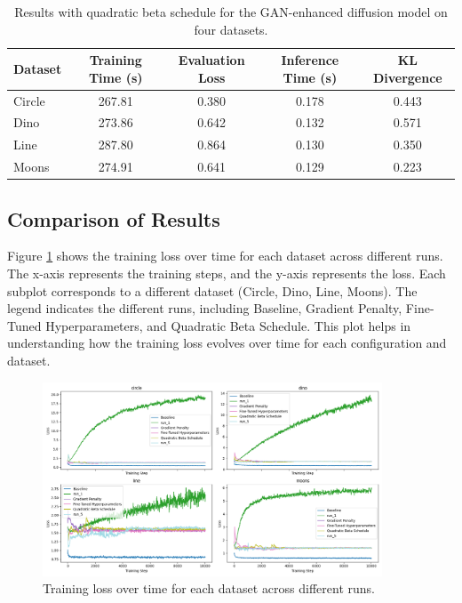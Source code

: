 \documentclass{article} %
\begin{document}
\begin{table}[h]
    \centering
    \begin{tabular}{lcccc}
        \toprule
        Dataset & Training Time (s) & Evaluation Loss & Inference Time (s) & KL Divergence \\
        \midrule
        Circle & 267.81 & 0.380 & 0.178 & 0.443 \\
        Dino & 273.86 & 0.642 & 0.132 & 0.571 \\
        Line & 287.80 & 0.864 & 0.130 & 0.350 \\
        Moons & 274.91 & 0.641 & 0.129 & 0.223 \\
        \bottomrule
    \end{tabular}
    \caption{Results with quadratic beta schedule for the GAN-enhanced diffusion model on four datasets.}
    \label{tab:quadratic_beta_results}
\end{table}

\subsection{Comparison of Results}
Figure \ref{fig:train_loss} shows the training loss over time for each dataset across different runs. The x-axis represents the training steps, and the y-axis represents the loss. Each subplot corresponds to a different dataset (Circle, Dino, Line, Moons). The legend indicates the different runs, including Baseline, Gradient Penalty, Fine-Tuned Hyperparameters, and Quadratic Beta Schedule. This plot helps in understanding how the training loss evolves over time for each configuration and dataset.

\begin{figure}[h]
    \centering
    \includegraphics[width=0.9\textwidth]{train_loss.png}
    \caption{Training loss over time for each dataset across different runs.}
    \label{fig:train_loss}
\end{figure}
\end{document}
